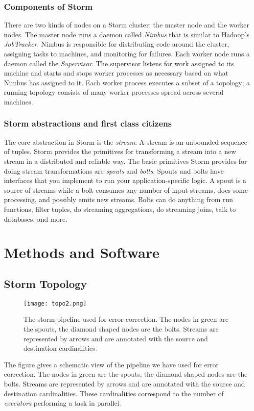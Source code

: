 \documentclass[11pt]{article}
\begin{document}
\subsubsection{Components of Storm}
There are two kinds of nodes on a Storm cluster: the master node and the worker nodes. The master node runs a daemon called \emph{Nimbus} that is similar to Hadoop's \emph{JobTracker}. Nimbus is responsible for distributing code around the cluster, assigning tasks to machines, and monitoring for failures. Each worker node runs a daemon called the \emph{Supervisor}. The supervisor listens for work assigned to its machine and starts and stops worker processes as necessary based on what Nimbus has assigned to it. Each worker process executes a subset of a topology; a running topology consists of many worker processes spread across several machines. 

\subsubsection{Storm abstractions and first class citizens}
The core abstraction in Storm is the \emph{stream}. A stream is an unbounded sequence of tuples. Storm provides the primitives for transforming a stream into a new stream in a distributed and reliable way. The basic primitives Storm provides for doing stream transformations are \emph{spouts} and \emph{bolts}. Spouts and bolts have interfaces that you implement to run your application-specific logic. A spout is a source of streams while a bolt consumes any number of input streams, does some processing, and possibly emits new streams. Bolts can do anything from run functions, filter tuples, do streaming aggregations, do streaming joins, talk to databases, and more.

\section{Methods and Software}
\subsection{Storm Topology}
\begin{figure}[ht!]
\centering
\texttt{[image: topo2.png]}
\caption{\tiny{The storm pipeline used for error correction. The nodes in green are the spouts, the diamond shaped nodes are the bolts. Streams are represented by arrows and are annotated with the source and destination cardinalities.}}
\label{overflow}
\end{figure}
The figure gives a schematic view of the pipeline we have used for error correction. The nodes in green are the spouts, the diamond shaped nodes are the bolts. Streams are represented by arrows and are annotated with the source and destination cardinalities. These cardinalities correspond to the number of \emph{executors} performing a task in parallel. 
\end{document}

